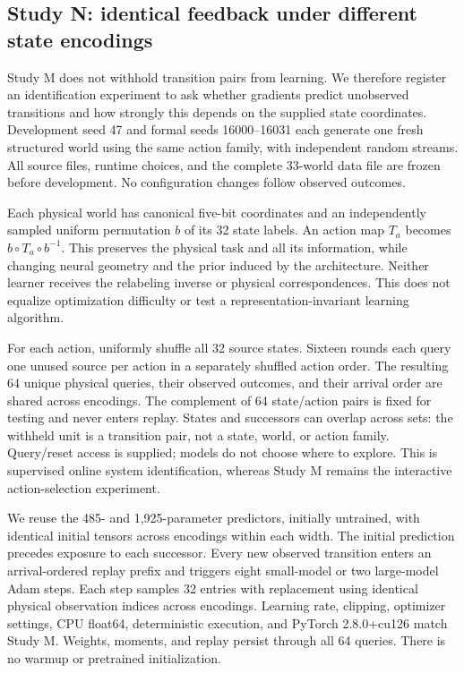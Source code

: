 \documentclass[11pt]{article}
\begin{document}
\subsection{Study N: identical feedback under different state encodings}
Study M does not withhold transition pairs from learning. We therefore register
an identification experiment to ask whether gradients predict unobserved
transitions and how strongly this depends on the supplied state coordinates.
Development seed 47 and formal seeds 16000--16031 each generate one fresh
structured world using the same action family, with independent random streams.
All source files, runtime choices, and the complete 33-world data file are
frozen before development. No configuration changes follow observed outcomes.

Each physical world has canonical five-bit coordinates and an independently
sampled uniform permutation $b$ of its 32 state labels. An action map $T_a$
becomes $b\circ T_a\circ b^{-1}$. This preserves the physical task and all its
information, while changing neural geometry and the prior induced by the
architecture. Neither learner receives the relabeling inverse or physical
correspondences. This does not equalize optimization difficulty or test a
representation-invariant learning algorithm.

For each action, uniformly shuffle all 32 source states. Sixteen rounds each
query one unused source per action in a separately shuffled action order.
The resulting 64 unique physical queries, their observed outcomes, and their
arrival order are shared across encodings. The complement of 64 state/action
pairs is fixed for testing and never enters replay. States and successors
can overlap across sets: the withheld unit is a transition pair, not a state,
world, or action family. Query/reset access is supplied; models do not choose
where to explore. This is supervised online system identification, whereas
Study M remains the interactive action-selection experiment.

We reuse the 485- and 1,925-parameter predictors, initially untrained, with
identical initial tensors across encodings within each width. The initial
prediction precedes exposure to each successor. Every new observed transition
enters an arrival-ordered replay prefix and triggers eight small-model or two
large-model Adam steps. Each step samples 32 entries with replacement using
identical physical observation indices across encodings. Learning rate,
clipping, optimizer settings, CPU float64, deterministic execution, and
PyTorch 2.8.0+cu126 match Study M. Weights, moments, and replay persist through
all 64 queries. There is no warmup or pretrained initialization.
\end{document}
